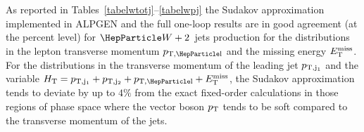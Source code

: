 \documentclass[11pt]{cernrep}
\begin{document}
As reported in Tables~\ref{tabelwtotj}--\ref{tabelwpj} the Sudakov
approximation implemented in {\sc ALPGEN} and the full one-loop
results are in good agreement (at the percent level) for $\PW+2$~jets
production for the distributions in the lepton transverse momentum
$p_{\rm T,\Pl}$ and the missing energy $E_{\rm T}^{\rm miss}$. For
the distributions in the transverse momentum of the leading jet
$p_{\rm T,j_1}$ and the variable $H_{\rm T}=p_{\rm T,j_1}+p_{\rm T,j_2}+p_{\rm T,\Pl}+E_{\rm T}^{\rm miss}$, the Sudakov
approximation tends to deviate by up to $4\%$ from the exact
fixed-order calculations in those regions of phase space where the
vector boson $p_{\rm T}$ tends to be soft compared to the transverse
momentum of the jets.

\end{document}
